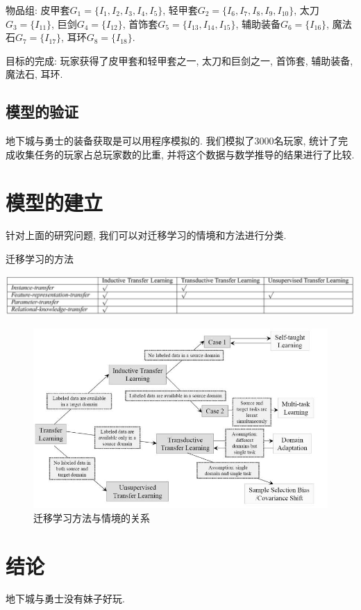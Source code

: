 \documentclass[10pt,journal,compsoc]{IEEEtran}
\begin{document}
  物品组: 皮甲套$G_1=\{I_1, I_2, I_3, I_4, I_5\}$, 轻甲套$G_2=\{I_6, I_7, I_8, I_9, I_{10}\}$, 太刀$G_3=\{I_{11}\}$, 巨剑$G_4=\{I_{12}\}$, 首饰套$G_5=\{I_{13}, I_{14}, I_{15}\}$, 辅助装备$G_6=\{I_{16}\}$, 魔法石$G_7=\{I_{17}\}$, 耳环$G_8=\{I_{18}\}$.
  
  
  
  目标的完成: 玩家获得了皮甲套和轻甲套之一, 太刀和巨剑之一, 首饰套, 辅助装备, 魔法石, 耳环. 



  \subsection{模型的验证}
    地下城与勇士的装备获取是可以用程序模拟的. 我们模拟了3000名玩家, 统计了完成收集任务的玩家占总玩家数的比重, 并将这个数据与数学推导的结果进行了比较. 

\section{模型的建立}

针对上面的研究问题, 我们可以对迁移学习的情境和方法进行分类. 

\begin{table}[!ht]
\centering
\caption{迁移学习的方法}
\label{tab:survey_method}
\includegraphics[width=40pc]{img/survey_tab3.jpg}
\end{table}

\begin{figure}[!ht]
\centering
\includegraphics[width=30pc]{img/survey_fig1.jpg}
\caption{迁移学习方法与情境的关系}
\label{fig:survey_method}
\end{figure}




\section{结论}

地下城与勇士没有妹子好玩. 



\end{document}
